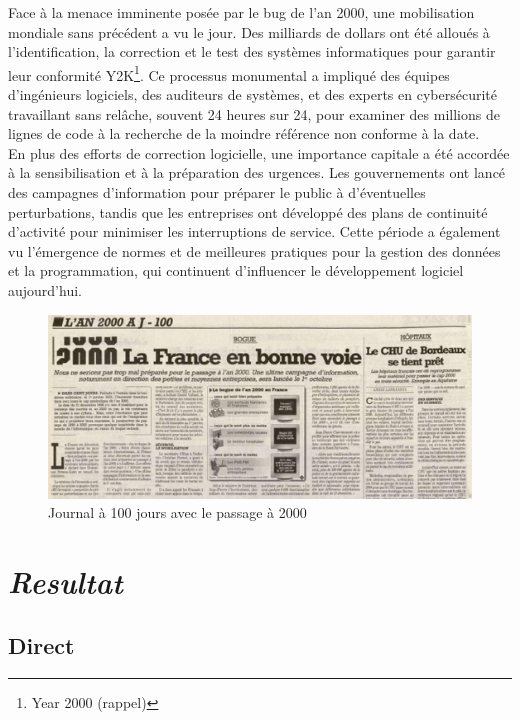 \documentclass[12pt,a4paper]{article}
\begin{document}
Face à la menace imminente posée par le bug de l'an 2000\cite{bug2000}, une mobilisation mondiale sans précédent a vu le jour. Des milliards de dollars ont été alloués à l'identification, la correction et le test des systèmes informatiques pour garantir leur conformité Y2K\footnote{Year 2000 (rappel)}. Ce processus monumental a impliqué des équipes d'ingénieurs logiciels, des auditeurs de systèmes, et des experts en cybersécurité travaillant sans relâche, souvent 24 heures sur 24, pour examiner des millions de lignes de code à la recherche de la moindre référence non conforme à la date. \\

En plus des efforts de correction logicielle, une importance capitale a été accordée à la sensibilisation et à la préparation des urgences. Les gouvernements ont lancé des campagnes d'information pour préparer le public à d'éventuelles perturbations, tandis que les entreprises ont développé des plans de continuité d'activité pour minimiser les interruptions de service. Cette période a également vu l'émergence de normes et de meilleures pratiques pour la gestion des données et la programmation, qui continuent d'influencer le développement logiciel aujourd'hui.


\begin{figure}[H]
    \centering
    \includegraphics[width=\textwidth]{./images/bug6.jpg}
    \caption{Journal à 100 jours avec le passage à 2000}
\end{figure}



\newpage
\section{\textit{Resultat}}

\subsection{Direct}
\end{document}
